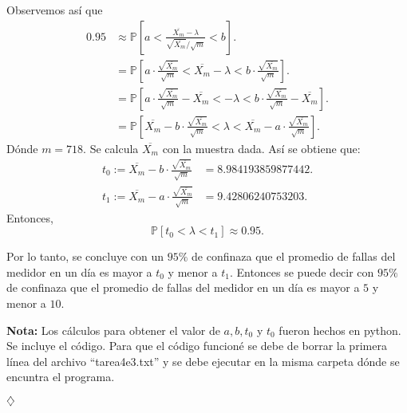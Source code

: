 \documentclass[letterpaper, 12pt]{article}
\renewcommand{\P}{\mathbb{P}}
\begin{document}
Observemos así que 
\begin{align*}
    0.95 &\approx \P\left[a < \frac{\overline{X_m}-\lambda}{\sqrt{\overline{X_m}}/\sqrt{m}} < b \right].\\
    &= \P\left[  a\cdot \frac{\sqrt{\overline{X_m}}}{\sqrt{m}} < \overline{X_m} - \lambda < b\cdot \frac{\sqrt{\overline{X_m}}}{\sqrt{m}}  \right].\\
    &= \P\left[  a\cdot \frac{\sqrt{\overline{X_m}}}{\sqrt{m}} - \overline{X_m}<  - \lambda < b\cdot \frac{\sqrt{\overline{X_m}}}{\sqrt{m}} - \overline{X_m} \right].\\
    &= \P\left[ \overline{X_m} -b\cdot \frac{\sqrt{\overline{X_m}}}{\sqrt{m}}  <  \lambda < \overline{X_m}-a\cdot \frac{\sqrt{\overline{X_m}}}{\sqrt{m}} \right].
\end{align*} 
Dónde $m=718$. Se calcula $\overline{X_m}$ con la muestra dada. Así se obtiene que:
\begin{align*}
    t_0 := \overline{X_m} -b\cdot \frac{\sqrt{\overline{X_m}}}{\sqrt{m}} &=  8.984193859877442.\\
    t_1 := \overline{X_m}-a\cdot \frac{\sqrt{\overline{X_m}}}{\sqrt{m}} &=  9.42806240753203.
\end{align*}
Entonces,
\[
    \P[t_0 < \lambda < t_1] \approx 0.95.
\]

Por lo tanto, se concluye con un $95\%$ de confinaza que el promedio de fallas del medidor en un día es mayor a $t_0$ y menor a $t_1$. Entonces se puede decir con $95\%$ de confinaza que el promedio de fallas del medidor en un día es mayor a $5$ y menor a $10$.

\textbf{Nota:} Los cálculos para obtener el valor de $a, b, t_0$ y $t_0$ fueron hechos en python. Se incluye el código. Para que el código funcioné se debe de borrar la primera línea del archivo ``tarea4e3.txt'' y se debe ejecutar en la misma carpeta dónde se encuntra el programa.

$\hfill\diamondsuit$
\end{document}
